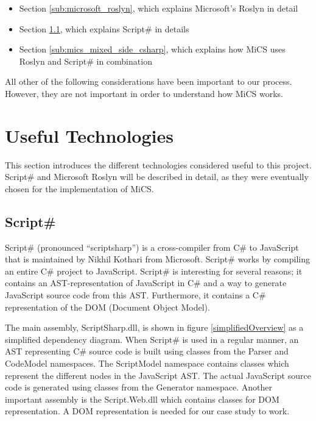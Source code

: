 	\begin{itemize}
		\item Section \ref{sub:microsoft_roslyn}, which explains Microsoft's Roslyn in detail
		\item Section \ref{sub:subsection_scriptsharp}, which explains Script\# in details
		\item Section \ref{sub:mics_mixed_side_csharp}, which explains how MiCS uses Roslyn and Script\# in combination
	\end{itemize}

	All other of the following considerations have been important to our process. However, they are not important in order to understand how MiCS works.

\section{Useful Technologies}
	\label{sec:useful_technologies}
	This section introduces the different technologies considered useful to this project. Script\# and Microsoft Roslyn will be described in detail, as they were eventually chosen for the implementation of MiCS.

	

	\subsection{Script\#} %
	\label{sub:subsection_scriptsharp}
		Script\# (pronounced ``scriptsharp'') \cite{scriptsharp} is a cross-compiler from C\# to JavaScript that is maintained by Nikhil Kothari \cite{nikhilk} from Microsoft. Script\# works by compiling an entire C\# project to JavaScript. Script\# is interesting for several reasons; it contains an AST-representation of JavaScript in C\# and a way to generate JavaScript source code from this AST. Furthermore, it contains a C\# representation of the DOM (Document Object Model).

		The main assembly, ScriptSharp.dll, is shown in figure \ref{simplifiedOverview} as a simplified dependency diagram. When Script\# is used in a regular manner, an AST representing C\# source code is built using classes from the Parser and CodeModel namespaces. The ScriptModel namespace contains classes which represent the different nodes in the JavaScript AST. The actual JavaScript source code is generated using classes from the Generator namespace. Another important assembly is the Script.Web.dll which contains classes for DOM representation. A DOM representation is needed for our case study to work.

